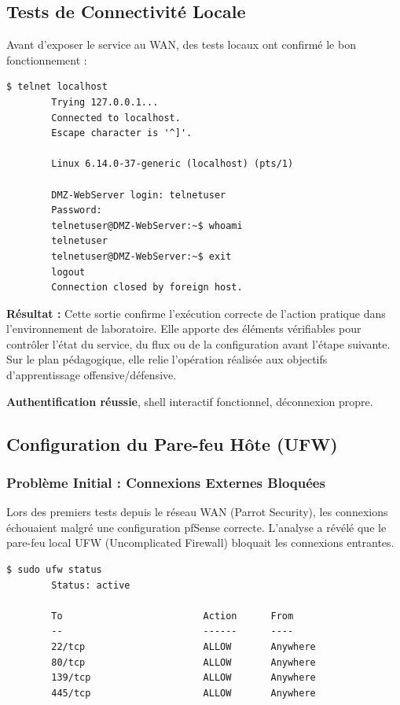 \documentclass[12pt,a4paper,openany]{report}
\begin{document}
	\subsection{Tests de Connectivité Locale}
	Avant d'exposer le service au WAN, des tests locaux ont confirmé le bon fonctionnement :
	
	\begin{lstlisting}[caption=Test Telnet en local (localhost)]
		$ telnet localhost
		Trying 127.0.0.1...
		Connected to localhost.
		Escape character is '^]'.
		
		Linux 6.14.0-37-generic (localhost) (pts/1)
		
		DMZ-WebServer login: telnetuser
		Password:
		telnetuser@DMZ-WebServer:~$ whoami
		telnetuser
		telnetuser@DMZ-WebServer:~$ exit
		logout
		Connection closed by foreign host.
	\end{lstlisting}
	
	\textbf{Résultat :} Cette sortie confirme l'exécution correcte de l'action pratique dans l'environnement de laboratoire. Elle apporte des éléments vérifiables pour contrôler l'état du service, du flux ou de la configuration avant l'étape suivante. Sur le plan pédagogique, elle relie l'opération réalisée aux objectifs d'apprentissage offensive/défensive.
	
	
	\textcolor{green}{\checkmark} \textbf{Authentification réussie}, shell interactif fonctionnel, déconnexion propre.
	
	\subsection{Configuration du Pare-feu Hôte (UFW)}
	
	\subsubsection{Problème Initial : Connexions Externes Bloquées}
	Lors des premiers tests depuis le réseau WAN (Parrot Security), les connexions échouaient malgré une configuration pfSense correcte. L'analyse a révélé que le pare-feu local UFW (Uncomplicated Firewall) bloquait les connexions entrantes.
	
	\begin{lstlisting}[caption=État initial du pare-feu UFW]
		$ sudo ufw status
		Status: active
		
		To                         Action      From
		--                         ------      ----
		22/tcp                     ALLOW       Anywhere
		80/tcp                     ALLOW       Anywhere
		139/tcp                    ALLOW       Anywhere
		445/tcp                    ALLOW       Anywhere
	\end{lstlisting}
	
\end{document}
